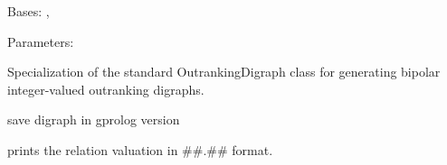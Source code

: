 \documentclass[letterpaper,10pt,english]{sphinxmanual}
\begin{document}
\begin{fulllineitems}
\label{techDoc:outrankingDigraphs.BipolarIntegerOutrankingDigraph}
Bases: {\hyperref[techDoc:outrankingDigraphs.BipolarOutrankingDigraph]{\emph{}}}, {\hyperref[techDoc:perfTabs.PerformanceTableau]{\emph{}}}
\begin{description}
\item[{Parameters:}] \leavevmode
{}

\end{description}

Specialization of the standard OutrankingDigraph class for generating
bipolar integer-valued outranking digraphs.

\begin{fulllineitems}
\label{techDoc:outrankingDigraphs.BipolarIntegerOutrankingDigraph.savePy2Gprolog}
save digraph in gprolog version

\end{fulllineitems}


\begin{fulllineitems}
\label{techDoc:outrankingDigraphs.BipolarIntegerOutrankingDigraph.showRelation}
prints the relation valuation in \#\#.\#\# format.

\end{fulllineitems}


\end{fulllineitems}

\end{document}
